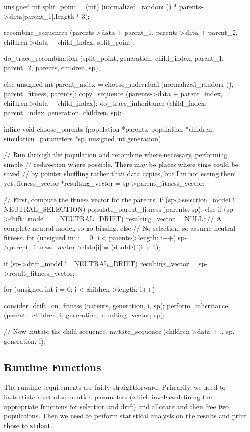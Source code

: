 \documentclass{article}
\begin{document}
\begin{ccode}
{{    unsigned int split_point = (int)
      (normalized_random () * parents->data[parent_1].length * 3);

    recombine_sequences (parents->data + parent_1,
			 parents->data + parent_2,
			 children->data + child_index,
			 split_point);

    do_trace_recombination (split_point, generation, child_index, parent_1,
			    parent_2, parents, children, sp);
  } else {
    unsigned int parent_index = choose_individual (normalized_random (), parent_fitness, parents);
    copy_sequence (parents->data + parent_index, children->data + child_index);
    do_trace_inheritance (child_index, parent_index, generation, children, sp);
  }
}

inline void choose_parents (population *parents, population *children,
			    simulation_parameters *sp, unsigned int generation) {
  // Run through the population and recombine where necessary, performing simple
  // redirection where possible. There may be places where time could be saved
  // by pointer shuffling rather than data copies, but I'm not seeing them yet.
  fitness_vector *resulting_vector = sp->parent_fitness_vector;

  // First, compute the fitness vector for the parents.
  if (sp->selection_model != NEUTRAL_SELECTION)
    populate_parent_fitness (parents, sp);
  else if (sp->drift_model == NEUTRAL_DRIFT)
    resulting_vector = NULL; // A complete neutral model, so no biasing.
  else
    // No selection, so assume neutral fitness.
    for (unsigned int i = 0; i < parents->length; i++)
      sp->parent_fitness_vector->data[i] = (double) (i + 1);

  if (sp->drift_model != NEUTRAL_DRIFT)
    resulting_vector = sp->result_fitness_vector;

  for (unsigned int i = 0; i < children->length; i++) {
    consider_drift_on_fitness (parents, generation, i, sp);
    perform_inheritance (parents, children, i, generation, resulting_vector, sp);

    // Now mutate the child sequence.
    mutate_sequence (children->data + i, sp, generation, i);
  }
}
\end{ccode}

    \subsection{Runtime Functions}

      The runtime requirements are fairly straightforward. Primarily, we need to
      instantiate a set of simulation parameters (which involves defining the
	  appropriate functions for selection and drift) and allocate and then
      free two populations. Then we need to perform statistical analysis on the
      results and print those to \verb|stdout|.
\end{document}
